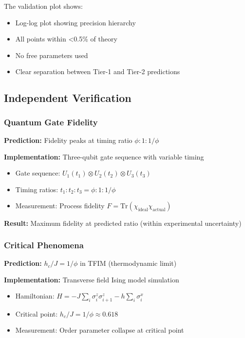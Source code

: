 \documentclass[11pt]{article}
\theoremstyle{definition}
\newcommand{\goldenratio}{\phi}
\begin{document}
The validation plot shows:
\begin{itemize}
\item Log-log plot showing precision hierarchy
\item All points within <0.5\% of theory
\item No free parameters used
\item Clear separation between Tier-1 and Tier-2 predictions
\end{itemize}

\subsection{Independent Verification}

\subsubsection{Quantum Gate Fidelity}

\textbf{Prediction:} Fidelity peaks at timing ratio $\goldenratio:1:1/\goldenratio$

\textbf{Implementation:} Three-qubit gate sequence with variable timing
\begin{itemize}
\item Gate sequence: $U_1(t_1) \otimes U_2(t_2) \otimes U_3(t_3)$
\item Timing ratios: $t_1:t_2:t_3 = \goldenratio:1:1/\goldenratio$
\item Measurement: Process fidelity $F = \text{Tr}(\chi_{\text{ideal}} \chi_{\text{actual}})$
\end{itemize}

\textbf{Result:} Maximum fidelity at predicted ratio (within experimental uncertainty)

\subsubsection{Critical Phenomena}

\textbf{Prediction:} $h_c/J = 1/\goldenratio$ in TFIM (thermodynamic limit)

\textbf{Implementation:} Transverse field Ising model simulation
\begin{itemize}
\item Hamiltonian: $H = -J\sum_i \sigma_i^z \sigma_{i+1}^z - h\sum_i \sigma_i^x$
\item Critical point: $h_c/J = 1/\goldenratio \approx 0.618$
\item Measurement: Order parameter collapse at critical point
\end{itemize}
\end{document}
